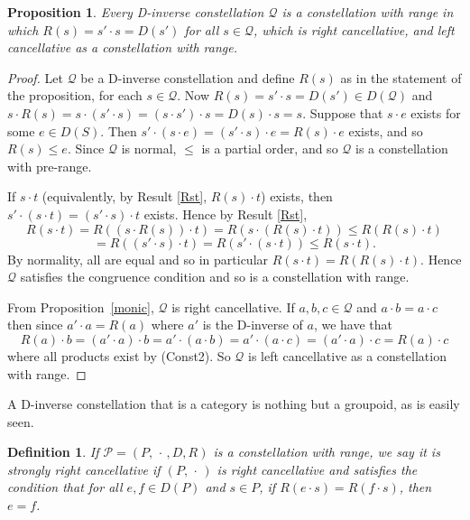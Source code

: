 \documentclass[12pt]{amsart}
\newtheorem{pro}[thm]{Proposition}
\newtheorem{dfn}[thm]{Definition}
\theoremstyle{definition}
\newcommand{\Pcon}{\mathcal P}
\newcommand{\Q}{\mathcal Q}
\begin{document}
\begin{pro}  \label{isopro}
Every D-inverse constellation $\Q$ is a constellation with range in which $R(s)=s'\cdot s=D(s')$ for all $s\in \Q$, which is right cancellative,  and  left cancellative as a constellation with range.
\end{pro}
\begin{proof}  Let $\Q$ be a D-inverse constellation and define $R(s)$ as in the statement of the proposition, for each $s\in \Q$.  Now $R(s)=s'\cdot s=D(s')\in D(\Q)$ and $s\cdot R(s)=s\cdot (s'\cdot s)=(s\cdot s')\cdot s=D(s)\cdot s=s$.  Suppose that $s\cdot e$ exists for some $e\in D(S)$.  Then $s'\cdot(s\cdot e)=(s'\cdot s)\cdot e=R(s)\cdot e$ exists, and so $R(s)\leq e$.  Since $\Q$ is normal, $\leq$ is a partial order, and so $\Q$ is a constellation with pre-range.  

If $s\cdot t$ (equivalently, by Result \ref{Rst}, $R(s)\cdot t$) exists, then $s'\cdot (s\cdot t)=(s'\cdot s)\cdot t$ exists.  Hence by Result \ref{Rst}, 
\[R(s\cdot t)=R((s\cdot R(s))\cdot t)=R(s\cdot (R(s)\cdot t))\leq R(R(s)\cdot t)\]\[=R((s'\cdot s)\cdot t)=R(s'\cdot (s\cdot t))\leq R(s\cdot t).\]
By normality, all are equal and so in particular $R(s\cdot t)=R(R(s)\cdot t)$.  Hence $\Q$ satisfies the congruence condition and so is a constellation with range.

From Proposition~\ref{monic}, $\Q$ is right cancellative.   If $a,b,c\in \Q$ and $a\cdot b=a\cdot c$ then since $a'\cdot a=R(a)$ where $a'$ is the D-inverse of $a$, we have that 
\[R(a)\cdot b=(a'\cdot a)\cdot b= a'\cdot (a\cdot b)=a'\cdot (a\cdot c)= (a'\cdot a)\cdot c=R(a)\cdot c\]
where all products exist by (Const2).   So $\Q$ is left cancellative as a constellation with range.
\end{proof}

A D-inverse constellation that is a category is nothing but a groupoid, as is easily seen. 
 
\begin{dfn}
If $\Pcon=(P,\, \cdot\, ,D,R)$ is a constellation with range, we say it is {\em strongly right cancellative} if $(P,\, \cdot\, )$ is right cancellative and satisfies the condition that for all $e,f\in D(P)$ and $s\in P$, if $R(e\cdot s)=R(f\cdot s)$, then $e=f$.  
\end{dfn}
\end{document}

